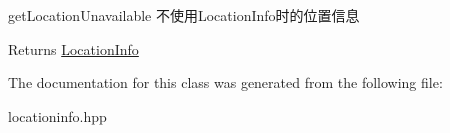get\+Location\+Unavailable 不使用\+Location\+Info时的位置信息 

\begin{DoxyReturn}{Returns}
\hyperlink{classdaq_1_1LocationInfo}{Location\+Info} 
\end{DoxyReturn}


The documentation for this class was generated from the following file\+:\begin{DoxyCompactItemize}
\item 
locationinfo.\+hpp\end{DoxyCompactItemize}
